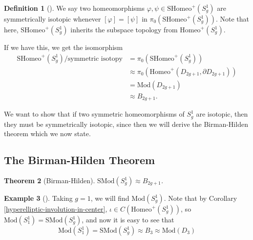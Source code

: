 \documentclass[reqno]{amsart}
\newtheorem{theorem}{Theorem}[section]
\theoremstyle{definition}
\newtheorem{definition}[theorem]{Definition}
\newtheorem{example}[theorem]{Example}
\theoremstyle{remark}
\newcommand{\Mod}{{\mathrm{Mod}}}
\newcommand{\SMod}{{\mathrm{SMod}}}
\newcommand{\Homeo}{{\mathrm{Homeo}}}
\newcommand{\SHomeo}{{\mathrm{SHomeo}}}
\begin{document}
   \begin{definition}[]
       We say two homeomorphisms
       $\varphi , \psi \in \SHomeo^{+}\left( S_g^{1} \right) $ 
       are symmetrically isotopic whenever
       $\left[ \varphi  \right] =
       \left[ \psi \right] $ in
       $\pi_0 \left( \SHomeo^{+}\left( S_g^{1} \right)  \right) $.
       Note that here,
       $\SHomeo^{+} \left( S_g^{1} \right) $ inherits
       the subspace topology from
       $\Homeo^{+} \left( S_{g}^{1} \right) $.
   \end{definition}

   If we have this, we get the isomorphism
   \begin{align*}
       \SHomeo^{+} \left( S_g^{1} \right) /
       \text{symmetric isotopy}
       &= \pi_0 \left( \SHomeo^{+}(S_g^{1}) \right) \\
       &\approx \pi_0 \left( \Homeo^{+} \left( 
       D_{2g+1}, \partial D_{2g+1} \right)  \right) \\
       &= \Mod \left( D_{2g+1} \right) \\
       &\approx B_{2g+1}.
   \end{align*}
   
   We want to show that
   if two symmetric homeomorphisms of $S_{g}^{1}$ are
   isotopic, then they must be symmetrically isotopic, since then
   we will derive the Birman-Hilden theorem which we now state.
 

   \subsection{The Birman-Hilden Theorem}

   \begin{theorem}[Birman-Hilden]
       $\SMod \left( S_g^{1} \right) \approx
       B_{2g+1}$.
   \end{theorem}


   \begin{example}[]
       Taking $g=1$, we will find
       $\Mod \left( S_g^{1} \right) $.
       Note that by Corollary
       \ref{hyperelliptic-involution-in-center},
       $\iota \in C\left( 
       \Homeo^{+}\left( S_g^{1} \right)  \right)  $, so
       $\Mod \left( S_1^{1} \right) =
       \SMod\left( S_g^{1} \right) $, and now it is
       easy to see that
       \[
       \Mod \left( S_1^{1} \right) = \SMod \left( S_g^{1} \right) 
       \approx B_{3} \approx \Mod \left( D_3 \right) 
       \] 
   \end{example}
\end{document}
